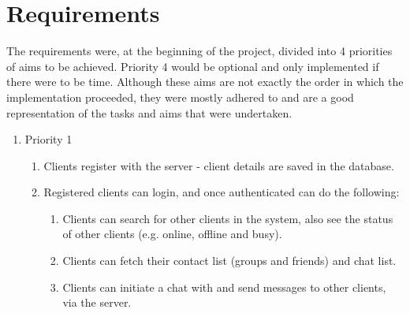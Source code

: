 \section{Requirements}
\label{requirements}
The requirements were, at the beginning of the project, divided into 4 priorities of aims to be achieved. Priority 4 would be optional and only implemented if there were to be time. Although these aims are not exactly the order in which the implementation proceeded, they were mostly adhered to and are a good representation of the tasks and aims that were undertaken. 

\begin{enumerate}
\item Priority 1
\begin{enumerate}[label*=\arabic*.]
\item Clients register with the server - client details are saved in the database. 

\item Registered clients can login, and once authenticated can do the following:
\begin{enumerate}[label*=\arabic*.]
\item Clients can search for other clients in the system, also see the status of other clients (e.g. online, offline and busy).

\item Clients can fetch their contact list (groups and friends) and chat list.

\item Clients can initiate a chat with and send messages to other clients, via the server.


\end{enumerate}
\end{enumerate}
\end{enumerate}
